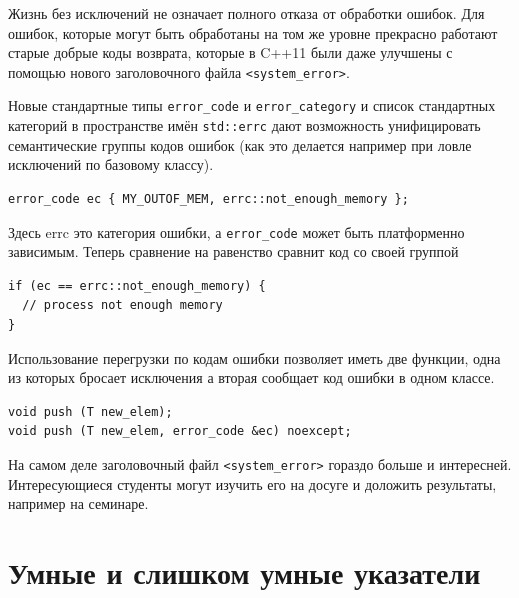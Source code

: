 \documentclass[a4paper,12pt,oneside]{book}
\begin{document}
Жизнь без исключений не означает полного отказа от обработки ошибок. Для ошибок, которые могут быть обработаны на том же уровне прекрасно работают старые добрые коды возврата, которые в C++11 были даже улучшены с помощью нового заголовочного файла \lstinline!<system_error>!.

Новые стандартные типы \lstinline!error_code! и \lstinline!error_category! и список стандартных категорий в пространстве имён \lstinline!std::errc! дают возможность унифицировать семантические группы кодов ошибок (как это делается например при ловле исключений по базовому классу).

\begin{lstlisting}
error_code ec { MY_OUTOF_MEM, errc::not_enough_memory };
\end{lstlisting}

Здесь errc это категория ошибки, а \lstinline!error_code! может быть платформенно зависимым. Теперь сравнение на равенство сравнит код со своей группой

\begin{lstlisting}
if (ec == errc::not_enough_memory) {
  // process not enough memory
}
\end{lstlisting}

Использование перегрузки по кодам ошибки позволяет иметь две функции, одна из которых бросает исключения а вторая сообщает код ошибки в одном классе.

\begin{lstlisting}
void push (T new_elem);
void push (T new_elem, error_code &ec) noexcept;
\end{lstlisting}

На самом деле заголовочный файл \lstinline!<system_error>! гораздо больше и интересней. Интересующиеся студенты могут изучить его на досуге и доложить результаты, например на семинаре.


\pagebreak
\section{Умные и слишком умные указатели}\label{SmartPointers}
\end{document}
